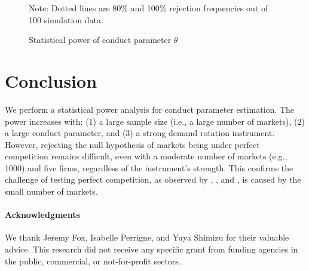 \documentclass[11pt, a4paper]{article}
\begin{document}
\begin{figure}[!ht]
\begin{center}
  \caption{Statistical power of conduct parameter $\theta$}
  \label{fg:theta_hat_power}
  \end{center}
  \footnotesize
  Note: Dotted lines are 80\% and 100\% rejection frequencies out of 100 simulation data.
\end{figure} 



\section{Conclusion}

We perform a statistical power analysis for conduct parameter estimation. 
The power increases with: (1) a large sample size (i.e., a large number of markets), (2) a large conduct parameter, and (3) a strong demand rotation instrument. 
However, rejecting the null hypothesis of markets being under perfect competition remains difficult, even with a moderate number of markets (e.g., 1000) and five firms, regardless of the instrument's strength. This confirms the challenge of testing perfect competition, as observed by \cite{genesove1998testing}, \cite{steen1999testing}, and \cite{shaffer1993test}, is caused by the small number of markets.


\paragraph{Acknowledgments}
We thank Jeremy Fox, Isabelle Perrigne, and Yuya Shimizu for their valuable advice. This research did not receive any specific grant from funding agencies in the public, commercial, or not-for-profit sectors. 
\end{document}

